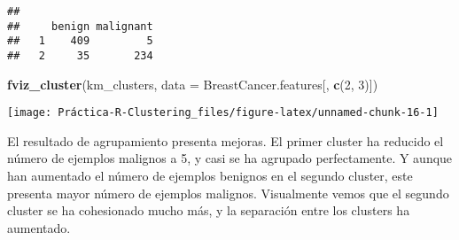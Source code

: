 \documentclass[
]{article}
\newenvironment{Shaded}{\begin{snugshade}}{\end{snugshade}}
\newcommand{\CommentTok}[1]{\textcolor[rgb]{0.56,0.35,0.01}{\textit{#1}}}
\newcommand{\DataTypeTok}[1]{\textcolor[rgb]{0.13,0.29,0.53}{#1}}
\newcommand{\DecValTok}[1]{\textcolor[rgb]{0.00,0.00,0.81}{#1}}
\newcommand{\KeywordTok}[1]{\textcolor[rgb]{0.13,0.29,0.53}{\textbf{#1}}}
\newcommand{\NormalTok}[1]{#1}
\newcommand{\OperatorTok}[1]{\textcolor[rgb]{0.81,0.36,0.00}{\textbf{#1}}}
\newcommand{\StringTok}[1]{\textcolor[rgb]{0.31,0.60,0.02}{#1}}
\begin{document}
\begin{Shaded}
\end{Shaded}

\begin{verbatim}
##    
##     benign malignant
##   1    409         5
##   2     35       234
\end{verbatim}

\begin{Shaded}
\begin{Highlighting}[]
\KeywordTok{fviz_cluster}\NormalTok{(km_clusters, }\DataTypeTok{data =}\NormalTok{ BreastCancer.features[, }\KeywordTok{c}\NormalTok{(}\DecValTok{2}\NormalTok{, }\DecValTok{3}\NormalTok{)])}
\end{Highlighting}
\end{Shaded}

\begin{center}\texttt{[image: Práctica-R-Clustering\_files/figure-latex/unnamed-chunk-16-1]} \end{center}

El resultado de agrupamiento presenta mejoras. El primer cluster ha
reducido el número de ejemplos malignos a 5, y casi se ha agrupado
perfectamente. Y aunque han aumentado el número de ejemplos benignos en
el segundo cluster, este presenta mayor número de ejemplos malignos.
Visualmente vemos que el segundo cluster se ha cohesionado mucho más, y
la separación entre los clusters ha aumentado.
\end{document}
